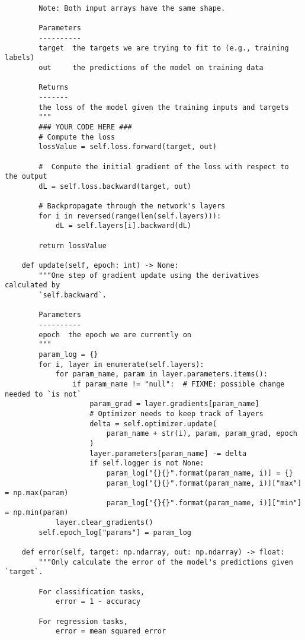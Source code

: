 \documentclass{article}
\begin{document}
\begin{enumerate}
\begin{verbatim}
        Note: Both input arrays have the same shape.

        Parameters
        ----------
        target  the targets we are trying to fit to (e.g., training labels)
        out     the predictions of the model on training data

        Returns
        -------
        the loss of the model given the training inputs and targets
        """
        ### YOUR CODE HERE ###
        # Compute the loss
        lossValue = self.loss.forward(target, out)

        #  Compute the initial gradient of the loss with respect to the output
        dL = self.loss.backward(target, out)

        # Backpropagate through the network's layers
        for i in reversed(range(len(self.layers))):
            dL = self.layers[i].backward(dL)

        return lossValue

    def update(self, epoch: int) -> None:
        """One step of gradient update using the derivatives calculated by
        `self.backward`.

        Parameters
        ----------
        epoch  the epoch we are currently on
        """
        param_log = {}
        for i, layer in enumerate(self.layers):
            for param_name, param in layer.parameters.items():
                if param_name != "null":  # FIXME: possible change needed to `is not`
                    param_grad = layer.gradients[param_name]
                    # Optimizer needs to keep track of layers
                    delta = self.optimizer.update(
                        param_name + str(i), param, param_grad, epoch
                    )
                    layer.parameters[param_name] -= delta
                    if self.logger is not None:
                        param_log["{}{}".format(param_name, i)] = {}
                        param_log["{}{}".format(param_name, i)]["max"] = np.max(param)
                        param_log["{}{}".format(param_name, i)]["min"] = np.min(param)
            layer.clear_gradients()
        self.epoch_log["params"] = param_log

    def error(self, target: np.ndarray, out: np.ndarray) -> float:
        """Only calculate the error of the model's predictions given `target`.

        For classification tasks,
            error = 1 - accuracy

        For regression tasks,
            error = mean squared error


\end{verbatim}
\end{enumerate}
\end{document}
